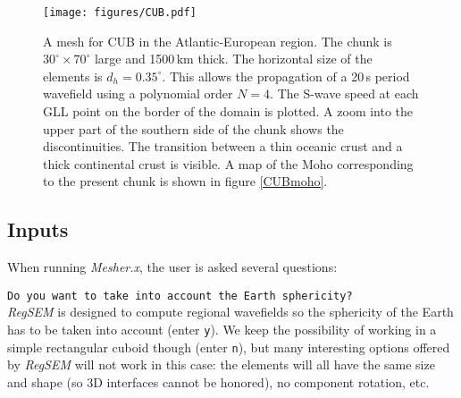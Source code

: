 \begin{figure}
\centerline{\texttt{[image: figures/CUB.pdf]}}
\caption{A mesh for CUB in the Atlantic-European region. The chunk is $\mbox{30}^{\circ} \times \mbox{70}^{\circ}$ large and 1500\,km thick. The horizontal size of the elements is $d_h=\mbox{0.35}^{\circ}$. This allows the propagation of a 20\,s period wavefield using a polynomial order $N=4$. The S-wave speed at each GLL point on the border of the domain is plotted. A zoom into the upper part of the southern side of the chunk shows the discontinuities. The transition between a thin oceanic crust and a thick continental crust is visible. A map of the Moho corresponding to the present chunk is shown in figure
\ref{CUBmoho}.}
\label{CUBmesh}
\end{figure}


\subsection{Inputs}
\label{input_mesh}

When running \textit{Mesher.x}, the user is asked several questions:

\texttt{Do you want to take into account the Earth sphericity?}\\
\textit{RegSEM} is designed to compute regional wavefields so the sphericity of the Earth has to be taken into account (enter \texttt{y}). We keep the possibility of working in a simple rectangular cuboid though (enter \texttt{n}), but many interesting options offered by \textit{RegSEM} will not work in this case: the elements will all have the same size and shape (so 3D interfaces cannot be honored), no component rotation, etc.

